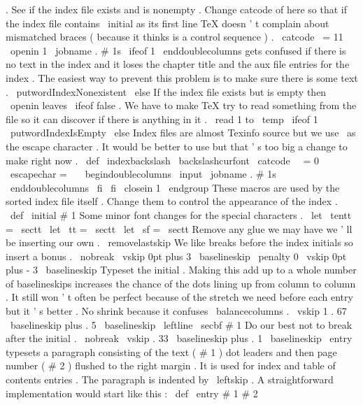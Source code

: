 {{.
%
%
See
if
the
index
file
exists
and
is
nonempty
.
%
Change
catcode
of
here
so
that
if
the
index
file
contains
%
\
initial
{
}
%
as
its
first
line
TeX
doesn
'
t
complain
about
mismatched
braces
%
(
because
it
thinks
}
is
a
control
sequence
)
.
\
catcode
\
=
11
\
openin
1
\
jobname
.
#
1s
\
ifeof
1
%
\
enddoublecolumns
gets
confused
if
there
is
no
text
in
the
index
%
and
it
loses
the
chapter
title
and
the
aux
file
entries
for
the
%
index
.
The
easiest
way
to
prevent
this
problem
is
to
make
sure
%
there
is
some
text
.
\
putwordIndexNonexistent
\
else
%
%
If
the
index
file
exists
but
is
empty
then
\
openin
leaves
\
ifeof
%
false
.
We
have
to
make
TeX
try
to
read
something
from
the
file
so
%
it
can
discover
if
there
is
anything
in
it
.
\
read
1
to
\
temp
\
ifeof
1
\
putwordIndexIsEmpty
\
else
%
Index
files
are
almost
Texinfo
source
but
we
use
\
as
the
escape
%
character
.
It
would
be
better
to
use
but
that
'
s
too
big
a
change
%
to
make
right
now
.
\
def
\
indexbackslash
{
\
backslashcurfont
}
%
\
catcode
\
\
=
0
\
escapechar
=
\
\
\
begindoublecolumns
\
input
\
jobname
.
#
1s
\
enddoublecolumns
\
fi
\
fi
\
closein
1
\
endgroup
}
%
These
macros
are
used
by
the
sorted
index
file
itself
.
%
Change
them
to
control
the
appearance
of
the
index
.
\
def
\
initial
#
1
{
{
%
%
Some
minor
font
changes
for
the
special
characters
.
\
let
\
tentt
=
\
sectt
\
let
\
tt
=
\
sectt
\
let
\
sf
=
\
sectt
%
%
Remove
any
glue
we
may
have
we
'
ll
be
inserting
our
own
.
\
removelastskip
%
%
We
like
breaks
before
the
index
initials
so
insert
a
bonus
.
\
nobreak
\
vskip
0pt
plus
3
\
baselineskip
\
penalty
0
\
vskip
0pt
plus
-
3
\
baselineskip
%
%
Typeset
the
initial
.
Making
this
add
up
to
a
whole
number
of
%
baselineskips
increases
the
chance
of
the
dots
lining
up
from
column
%
to
column
.
It
still
won
'
t
often
be
perfect
because
of
the
stretch
%
we
need
before
each
entry
but
it
'
s
better
.
%
%
No
shrink
because
it
confuses
\
balancecolumns
.
\
vskip
1
.
67
\
baselineskip
plus
.
5
\
baselineskip
\
leftline
{
\
secbf
#
1
}
%
%
Do
our
best
not
to
break
after
the
initial
.
\
nobreak
\
vskip
.
33
\
baselineskip
plus
.
1
\
baselineskip
}
}
%
\
entry
typesets
a
paragraph
consisting
of
the
text
(
#
1
)
dot
leaders
and
%
then
page
number
(
#
2
)
flushed
to
the
right
margin
.
It
is
used
for
index
%
and
table
of
contents
entries
.
The
paragraph
is
indented
by
\
leftskip
.
%
%
A
straightforward
implementation
would
start
like
this
:
%
\
def
\
entry
#
1
#
2
